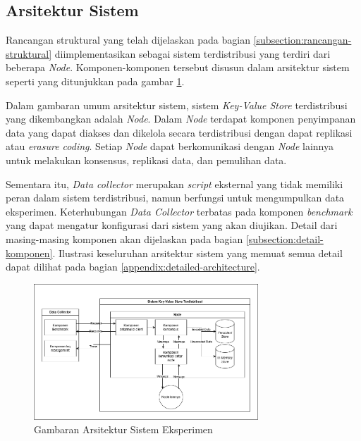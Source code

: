 \subsection{Arsitektur Sistem}
\label{subsection:system-architecture}

Rancangan struktural yang telah dijelaskan pada bagian \ref{subsection:rancangan-struktural} diimplementasikan sebagai sistem terdistribusi yang terdiri dari beberapa \textit{Node}. Komponen-komponen tersebut disusun dalam arsitektur sistem seperti yang ditunjukkan pada gambar \ref{fig:general-architecture}.

Dalam gambaran umum arsitektur sistem, sistem \textit{Key-Value Store} terdistribusi yang dikembangkan adalah \textit{Node}. Dalam \textit{Node} terdapat komponen penyimpanan data yang dapat diakses dan dikelola secara terdistribusi dengan dapat replikasi atau \textit{erasure coding}. Setiap \textit{Node} dapat berkomunikasi dengan \textit{Node} lainnya untuk melakukan konsensus, replikasi data, dan pemulihan data.

Sementara itu, \textit{Data collector} merupakan \textit{script} eksternal yang tidak memiliki peran dalam sistem terdistribusi, namun berfungsi untuk mengumpulkan data eksperimen. Keterhubungan \textit{Data Collector} terbatas pada komponen \textit{benchmark} yang dapat mengatur konfigurasi dari sistem yang akan diujikan. Detail dari masing-masing komponen akan dijelaskan pada bagian \ref{subsection:detail-komponen}. Ilustrasi keseluruhan arsitektur sistem yang memuat semua detail dapat dilihat pada bagian \ref{appendix:detailed-architecture}.

\begin{figure}[ht]
    \centering
    \includegraphics[width=0.75\textwidth]{resources/chapter-3/general-architecture.png}
    \caption{Gambaran Arsitektur Sistem Eksperimen}
    \label{fig:general-architecture}
\end{figure}


